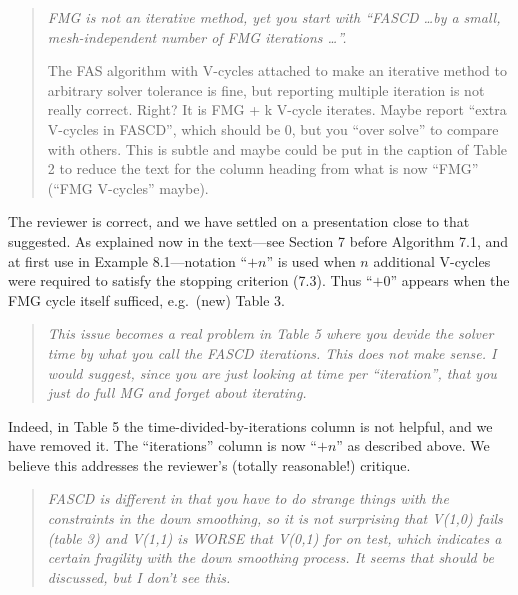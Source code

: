 \documentclass[letterpaper,final,12pt,reqno]{amsart}
\newenvironment{review}%
{\bigskip \par \begin{quote} \selectfont \sl}%
{\end{quote}}
\newcommand\short[1]{\medskip\noindent #1}   %
\begin{document}
\begin{review}
FMG is not an iterative method, yet you start with ``FASCD \dots by a small, mesh-independent number of FMG iterations \dots''.

The FAS algorithm with V-cycles attached to make an iterative method to arbitrary solver tolerance is fine, but reporting multiple iteration is not really correct.  Right?  It is FMG + k V-cycle iterates.  Maybe report ``extra V-cycles in FASCD'', which should be 0, but you ``over solve'' to compare with others.  This is subtle and maybe could be put in the caption of Table 2 to reduce the text for the column heading from what is now ``FMG'' (``FMG V-cycles'' maybe).
\end{review}

\short{The reviewer is correct, and we have settled on a presentation close to that suggested.  As explained now in the text---see Section 7 before Algorithm 7.1, and at first use in Example 8.1---notation ``$+n$'' is used when $n$ additional V-cycles were required to satisfy the stopping criterion (7.3).  Thus ``$+0$'' appears when the FMG cycle itself sufficed, e.g.~(new) Table 3. }


\begin{review}
This issue becomes a real problem in Table 5 where you devide the solver time by what you call the FASCD iterations.  This does not make sense. I would suggest, since you are just looking at time per ``iteration'', that you just do full MG and forget about iterating.
\end{review}

\short{Indeed, in Table 5 the time-divided-by-iterations column is not helpful, and we have removed it.  The ``iterations'' column is now ``$+n$'' as described above.  We believe this addresses the reviewer's (totally reasonable!) critique.}

\begin{review}
FASCD is different in that you have to do strange things with the constraints in the down smoothing, so it is not surprising that V(1,0) fails (table 3) and V(1,1) is WORSE that V(0,1) for on test, which indicates a certain fragility with the down smoothing process. It seems that should be discussed, but I don't see this.
\end{review}
\end{document}
